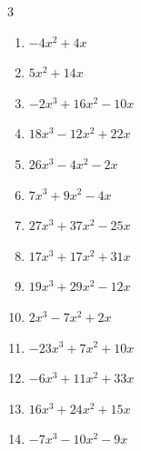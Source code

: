 \documentclass[11pt]{article}
\begin{document}
\begin{multicols}{3}
\begin{enumerate}
  \item $- 4 x^{2} + 4 x$
  \item $5 x^{2} + 14 x$
  \item $- 2 x^{3} + 16 x^{2} - 10 x$
  \item $18 x^{3} - 12 x^{2} + 22 x$
  \item $26 x^{3} - 4 x^{2} - 2 x$
  \item $7 x^{3} + 9 x^{2} - 4 x$
  \item $27 x^{3} + 37 x^{2} - 25 x$
  \item $17 x^{3} + 17 x^{2} + 31 x$
  \item $19 x^{3} + 29 x^{2} - 12 x$
  \item $2 x^{3} - 7 x^{2} + 2 x$
  \item $- 23 x^{3} + 7 x^{2} + 10 x$
  \item $- 6 x^{3} + 11 x^{2} + 33 x$
  \item $16 x^{3} + 24 x^{2} + 15 x$
  \item $- 7 x^{3} - 10 x^{2} - 9 x$
\end{enumerate}
\end{multicols}
\end{document}
